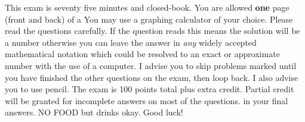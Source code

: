\documentclass[12pt]{article}
\begin{document}
This exam is seventy five minutes and closed-book. You are allowed \textbf{one} page (front and back) of a  You may use a graphing calculator of your choice. Please read the questions carefully. If the question reads  this means the solution will be a number otherwise you can leave the answer in \textit{any} widely accepted mathematical notation which could be resolved to an exact or approximate number with the use of a computer. I advise you to skip problems marked  until you have finished the other questions on the exam, then loop back. I also advise you to use pencil. The exam is 100 points total plus extra credit. Partial credit will be granted for incomplete answers on most of the questions.  in your final answers. NO FOOD but drinks okay. Good luck!

\pagebreak
\end{document}
